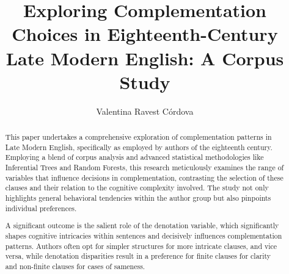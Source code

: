 \documentclass[final]{clv3} %
\begin{document}
\clearpage
\let\cleardoublepage\clearpage


\title{Exploring Complementation Choices in Eighteenth-Century Late Modern English: A Corpus Study}

\author{Valentina Ravest Córdova}

\maketitle


\begin{abstract}
This paper undertakes a comprehensive exploration of complementation patterns in Late Modern English, specifically as employed by authors of the eighteenth century. Employing a blend of corpus analysis and advanced statistical methodologies like Inferential Trees and Random Forests, this research meticulously examines the range of variables that influence decisions in complementation, contrasting the selection of these clauses and their relation to the cognitive complexity involved. The study not only highlights general behavioral tendencies within the author group but also pinpoints individual preferences.

A significant outcome is the salient role of the denotation variable, which significantly shapes cognitive intricacies within sentences and decisively influences complementation patterns. Authors often opt for simpler structures for more intricate clauses, and vice versa, while denotation disparities result in a preference for finite clauses for clarity and non-finite clauses for cases of sameness.
\end{abstract}
\end{document}
